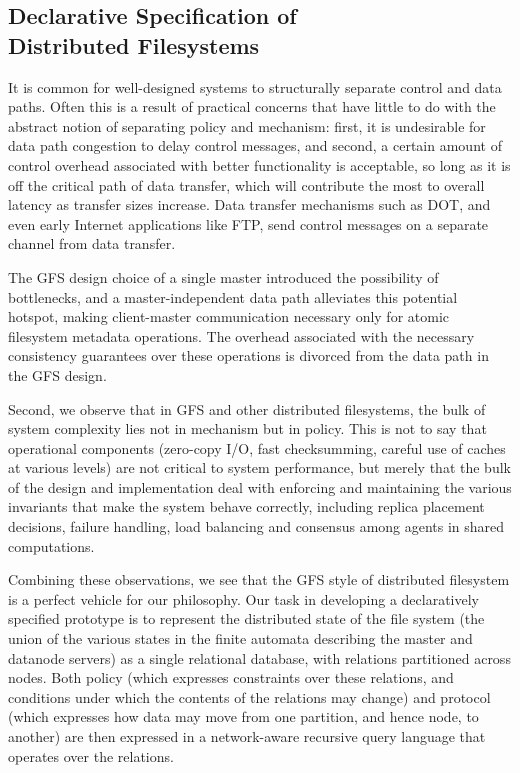 \documentclass{article}
\begin{document}
\subsection{Declarative Specification of\\Distributed Filesystems}
It is common for well-designed systems to structurally separate control and data paths.  Often this is a result of practical concerns that have little to do with the abstract notion of separating policy and mechanism: first, it is undesirable for data path congestion to delay control messages, and second, a certain amount of control overhead associated with better functionality is acceptable, so long as it is off the critical path of data transfer, which will contribute the most to overall latency as transfer sizes increase.  Data transfer mechanisms such as DOT, and even early Internet applications like FTP, send control messages on a separate channel from data transfer.

The GFS design choice of a single master introduced the possibility of bottlenecks, and a master-independent data path alleviates this potential hotspot, making client-master communication necessary only for atomic filesystem metadata operations.   The overhead associated with the necessary consistency guarantees over these operations is divorced from the data path in the GFS design.

Second, we observe that in GFS and other distributed filesystems, the bulk of system complexity lies not in mechanism but in policy.  This is not to say that operational components (zero-copy I/O, fast checksumming, careful use of caches at various levels) are not critical to system performance, but merely that the bulk of the design and implementation deal with enforcing and maintaining the various invariants that make the system behave correctly, including replica placement decisions, failure handling, load balancing and consensus among agents in shared computations.

Combining these observations, we see that the GFS style of distributed filesystem is a perfect vehicle for our philosophy.  Our task in developing a declaratively specified prototype is to represent the distributed state of the file system (the union of the various states in the finite automata describing the master and datanode servers) as a single relational database, with relations partitioned across nodes.  Both policy (which expresses constraints over these relations, and conditions under which the contents of the relations may change) and protocol (which expresses how data may move from one partition, and hence node,  to another) are then expressed in a network-aware recursive query language that operates over the relations.
\end{document}
